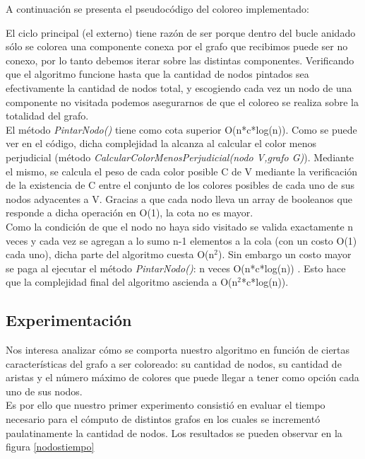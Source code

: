 A continuación se presenta el pseudocódigo del coloreo implementado:

\begin{algorithmic} 
		\ENDIF
	\ENDWHILE
\ENDWHILE
\end{algorithmic}


El ciclo principal (el externo) tiene razón de ser porque dentro del bucle anidado sólo se colorea una componente conexa por el grafo que recibimos puede ser no conexo, por lo tanto debemos iterar sobre las distintas componentes. Verificando que el algoritmo funcione hasta que la cantidad de nodos pintados sea efectivamente la cantidad de nodos total, y escogiendo cada vez un nodo de una componente no visitada podemos asegurarnos de que el coloreo se realiza sobre la totalidad del grafo.\\
El método \textit{PintarNodo()} tiene como cota superior O(n*c*log(n)). Como se puede ver en el código, dicha complejidad la alcanza al calcular el color menos perjudicial (método \textit{CalcularColorMenosPerjudicial(nodo V,grafo G)}). Mediante el mismo, se calcula el peso de cada color posible C de V mediante la verificación de la existencia de C entre el conjunto de los colores posibles de cada uno de sus nodos adyacentes a V. Gracias a que cada nodo lleva un array de booleanos que responde a dicha operación en O(1), la cota no es mayor.\\
Como la condición de que el nodo no haya sido visitado se valida exactamente n veces y cada vez se agregan a lo sumo n-1 elementos a la cola (con un costo O(1) cada uno), dicha parte del algoritmo cuesta O(n$^{2}$). Sin embargo un costo mayor se paga al ejecutar el método \textit{PintarNodo()}: n veces O(n*c*log(n)) . Esto hace que la complejidad final del algoritmo ascienda a O(n$^{2}$*c*log(n)).

\subsection{Experimentación}
Nos interesa analizar cómo se comporta nuestro algoritmo en función de ciertas características del grafo a ser coloreado: su cantidad de nodos, su cantidad de aristas y el número máximo de colores que puede llegar a tener como opción cada uno de sus nodos.\\
 Es por ello que nuestro primer experimento consistió en evaluar el tiempo necesario para el cómputo de distintos grafos en los cuales se incrementó paulatinamente la cantidad de nodos. Los resultados se pueden observar en la figura \ref{nodostiempo}

